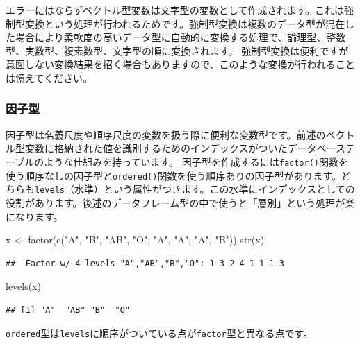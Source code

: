 \documentclass[
  12pt,
]{book}
\newenvironment{Shaded}{\begin{snugshade}}{\end{snugshade}}
\newcommand{\FunctionTok}[1]{\textcolor[rgb]{0.00,0.00,0.00}{#1}}
\newcommand{\NormalTok}[1]{#1}
\newcommand{\OtherTok}[1]{\textcolor[rgb]{0.56,0.35,0.01}{#1}}
\newcommand{\StringTok}[1]{\textcolor[rgb]{0.31,0.60,0.02}{#1}}
\begin{document}
エラーにはならずベクトル型変数は文字型の変数として作成されます。これは強制型変換という処理が行われるためです。強制型変換は複数のデータ型が混在した場合により柔軟度の高いデータ型に自動的に変換する処理で、論理型、整数型、実数型、複素数型、文字型の順に変換されます。 強制型変換は便利ですが意図しない変換結果を招く場合もありますので、このような変換が行われることは憶えてください。

\hypertarget{ux56e0ux5b50ux578b}{%
\subsubsection{因子型}\label{ux56e0ux5b50ux578b}}

因子型は名義尺度や順序尺度の変数を扱う際に便利な変数型です。前述のベクトル型変数に格納された値を識別するためのインデックスがついたデータベーステーブルのような仕組みを持っています。 因子型を作成するには\texttt{factor()}関数を使う順序なしの因子型と\texttt{ordered()}関数を使う順序ありの因子型があります。どちらも\texttt{levels}（水準）という属性がつきます。この水準にインデックスとしての役割があります。後述のデータフレーム型の中で使うと「層別」という処理が楽になります。

\begin{Shaded}
\begin{Highlighting}[numbers=left,,]
\NormalTok{x }\OtherTok{\textless{}{-}} \FunctionTok{factor}\NormalTok{(}\FunctionTok{c}\NormalTok{(}\StringTok{"A"}\NormalTok{, }\StringTok{"B"}\NormalTok{, }\StringTok{"AB"}\NormalTok{, }\StringTok{"O"}\NormalTok{, }\StringTok{"A"}\NormalTok{, }\StringTok{"A"}\NormalTok{, }\StringTok{"A"}\NormalTok{, }\StringTok{"B"}\NormalTok{))}
\FunctionTok{str}\NormalTok{(x)}
\end{Highlighting}
\end{Shaded}

\begin{verbatim}
##  Factor w/ 4 levels "A","AB","B","O": 1 3 2 4 1 1 1 3
\end{verbatim}

\begin{Shaded}
\begin{Highlighting}[numbers=left,,]
\FunctionTok{levels}\NormalTok{(x)}
\end{Highlighting}
\end{Shaded}

\begin{verbatim}
## [1] "A"  "AB" "B"  "O"
\end{verbatim}

\texttt{ordered}型は\texttt{levels}に順序がついている点が\texttt{factor}型と異なる点です。
\end{document}

